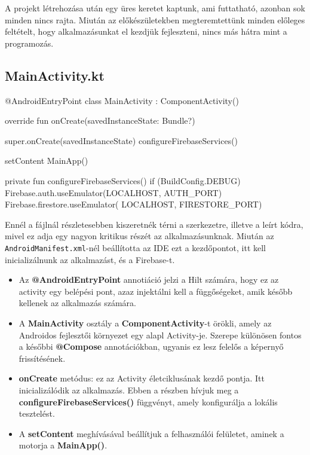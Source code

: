 A projekt létrehozása után egy üres keretet kaptunk, ami futtatható, azonban sok minden nincs rajta. Miután az előkészületekben megteremtettünk minden előleges feltételt, hogy alkalmazásunkat el kezdjük fejleszteni, nincs más hátra mint a programozás.

\subsection{MainActivity.kt}

\begin{java}[caption = {MainActivity.kt fájl egy részlete}]
@AndroidEntryPoint
class MainActivity : ComponentActivity() {
    override fun onCreate(savedInstanceState: Bundle?) {
        super.onCreate(savedInstanceState)
        configureFirebaseServices()

        setContent { MainApp() }
    }

    private fun configureFirebaseServices() {
        if (BuildConfig.DEBUG) {
            Firebase.auth.useEmulator(LOCALHOST, AUTH_PORT)
            Firebase.firestore.useEmulator(
            LOCALHOST, FIRESTORE_PORT)
        }
    }
}
\end{java}

Ennél a fájlnál részletesebben kiszeretnék térni a szerkezetre, illetve a leírt kódra, mivel ez adja egy nagyon kritikus részét az alkalmazásunknak. Miután az \newline
\texttt{AndroidManifest.xml}-nél beállította az IDE ezt a kezdőpontot, itt kell inicializálnunk az alkalmazást, és a Firebase-t.
\begin{itemize}
    \item Az \textbf{@AndroidEntryPoint} annotiáció jelzi a Hilt számára, hogy ez az activity egy belépési pont, azaz injektálni kell a függőségeket, amik később kellenek az alkalmazás számára.
    \item A \textbf{MainActivity} osztály a \textbf{ComponentActivity}-t örökli, amely az Androidos fejlesztői környezet egy alapl Activity-je. Szerepe különösen fontos a későbbi \textbf{@Compose} annotációkban, ugyanis ez lesz felelős a képernyő frissítésének.
    \item \textbf{onCreate} metódus: ez az Activity életciklusának kezdő pontja. Itt inicializálódik az alkalmazás. Ebben a részben hívjuk meg a 
    \textbf{configureFirebaseServices()} függvényt, amely konfigurálja a lokális tesztelést.
    \item A \textbf{setContent} meghívásával beállítjuk a felhasználói felületet, aminek a motorja a \textbf{MainApp()}.
\end{itemize}

